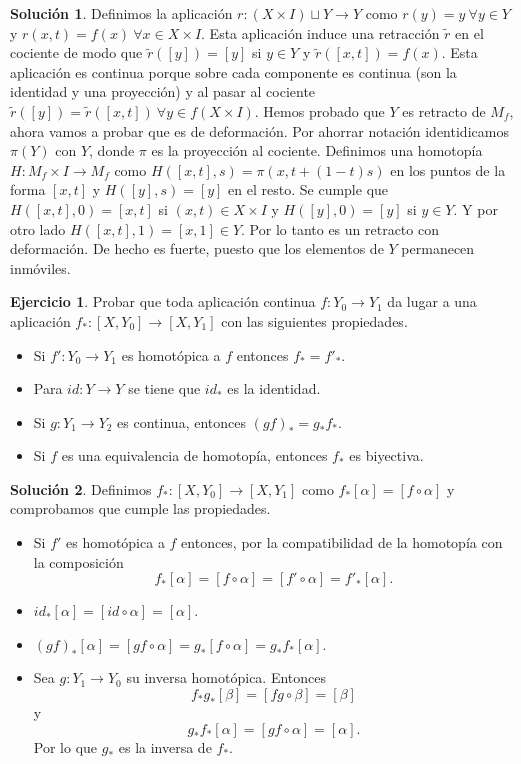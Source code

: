 \documentclass{article}
\theoremstyle{plain}
\theoremstyle{definition}
\newtheorem{exercise}{Ejercicio}
\newtheorem*{sol*}{Solución}
\begin{document}
\begin{sol*}
Definimos la aplicación $r:(X\times I)\sqcup Y\to Y$ como $r(y)=y\ \forall y\in Y$ y $r(x,t)=f(x)\ \forall x\in X\times I$. Esta aplicación induce una retracción $\tilde{r}$ en el cociente de modo que $\tilde{r}([y])=[y]$ si $y\in Y$ y $\tilde{r}([x,t])=f(x)$. Esta aplicación es continua porque sobre cada componente es continua (son la identidad y una proyección) y al pasar al cociente $\tilde{r}([y])=\tilde{r}([x,t])\ \forall y\in f(X\times I)$. Hemos probado que $Y$ es retracto de $M_f$, ahora vamos a probar que es de deformación. Por ahorrar notación identidicamos $\pi(Y)$ con $Y$, donde $\pi$ es la proyección al cociente. Definimos una homotopía $H:M_f\times I \to M_f$ como $H([x,t],s)=\pi(x,t+(1-t)s)$ en los puntos de la forma $[x,t]$ y $H([y],s)=[y]$ en el resto. Se cumple que $H([x,t],0)=[x,t]$ si $(x,t)\in X\times I$ y $H([y],0)=[y]$ si $y\in Y$. Y por otro lado $H([x,t],1)=[x,1]\in Y$. Por lo tanto es un retracto con deformación. De hecho es fuerte, puesto que los elementos de $Y$ permanecen inmóviles.

\end{sol*}
\newpage
\begin{exercise}
Probar que toda aplicación continua $f:Y_0\to Y_1$ da lugar a una aplicación $f_*:[X,Y_0]\to[X,Y_1]$ con las siguientes propiedades.
\begin{itemize}
\item Si $f':Y_0\to Y_1$ es homotópica a $f$ entonces $f_* =f'_*$.
\item Para $id:Y\to Y$ se tiene que $id_*$ es la identidad.
\item Si $g:Y_1\to Y_2$ es continua, entonces $(gf)_* = g_*f_*$.
\item Si $f$ es una equivalencia de homotopía, entonces $f_*$ es biyectiva.
\end{itemize}
\end{exercise}
\begin{sol*}
Definimos $f_*:[X,Y_0]\to[X,Y_1]$ como $f_*[\alpha]=[f\circ\alpha]$ y comprobamos que cumple las propiedades. 
\begin{itemize}
\item Si $f'$ es homotópica a $f$ entonces, por la compatibilidad de la homotopía con la composición 
$$f_*[\alpha]=[f\circ\alpha]=[f'\circ\alpha]=f'_*[\alpha].$$
\item $id_*[\alpha]=[id\circ\alpha]=[\alpha]$.
\item $(gf)_*[\alpha]=[gf\circ\alpha]=g_*[f\circ\alpha]=g_*f_*[\alpha]$.
\item Sea $g:Y_1\to Y_0$ su inversa homotópica. Entonces
$$f_*g_*[\beta]=[fg\circ\beta]=[\beta]$$
y 
$$g_*f_*[\alpha]=[gf\circ\alpha]=[\alpha].$$
Por lo que $g_*$ es la inversa de $f_*$. 
\end{itemize}
\end{sol*}
\end{document}
